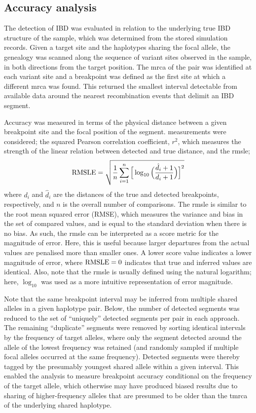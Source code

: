 %
\subsection{Accuracy analysis}
\label{sec:ibd_analysis}
%

The detection of IBD was evaluated in relation to the underlying true IBD structure of the sample, which was determined from the stored simulation records.
Given a target site and the  haplotypes sharing the focal allele, the genealogy was scanned along the sequence of variant sites observed in the sample, in both directions from the target position.
The \gls{mrca} of the pair was identified at each variant site and a breakpoint was defined as the first site at which a different \gls{mrca} was found.
This returned the smallest interval detectable from available data around the nearest recombination events that delimit an IBD segment.

Accuracy was measured in terms of the physical distance between a given breakpoint site and the focal position of the segment.
 measurements were considered; the squared Pearson correlation coefficient, $r^2$, which measures the strength of the linear relation between detected and true distance, and the \gls{rmsle};
\begin{equation}\label{eq:rmsle}
	\operatorname*{RMSLE} = \sqrt{ \frac{1}{n} \sum_{i=1}^n \Big[\log_{10}\Big(\frac{\hat{d}_i + 1}{d_i + 1}\Big)\Big]^2 }
\end{equation}
where $d_i$ and $\hat{d}_i$ are the distances of the true and detected breakpoints, respectively, and $n$ is the overall number of comparisons.
The \gls{rmsle} is similar to the root mean squared error (RMSE), which measures the variance and bias in the set of compared values, and is equal to the standard deviation when there is no bias.
As such, the \gls{rmsle} can be interpreted as a score metric for the magnitude of error.
Here, this is useful because larger departures from the actual values are penalised more than smaller ones.
A lower score value indicates a lower magnitude of error, where ${\operatorname*{RMSLE} = 0}$ indicates that true and inferred values are identical.
Also, note that the \gls{rmsle} is usually defined using the natural logarithm; here, $\log_{10}$ was used as a more intuitive representation of error magnitude.

Note that the same breakpoint interval may be inferred from multiple shared alleles in a given haplotype pair.
Below, the number of detected segments was reduced to the set of ``uniquely'' detected segments per pair in each approach.
The remaining ``duplicate'' segments were removed by sorting identical intervals by the frequency of target alleles, where only the segment detected around the allele of the lowest frequency was retained (and randomly sampled if multiple focal alleles occurred at the same frequency).
Detected segments were thereby tagged by the presumably youngest shared allele within a given interval.
This enabled the analysis to measure breakpoint accuracy conditional on the frequency of the target allele, which otherwise may have produced biased results due to sharing of higher-frequency alleles that are presumed to be older than the \gls{tmrca} of the underlying shared haplotype.

